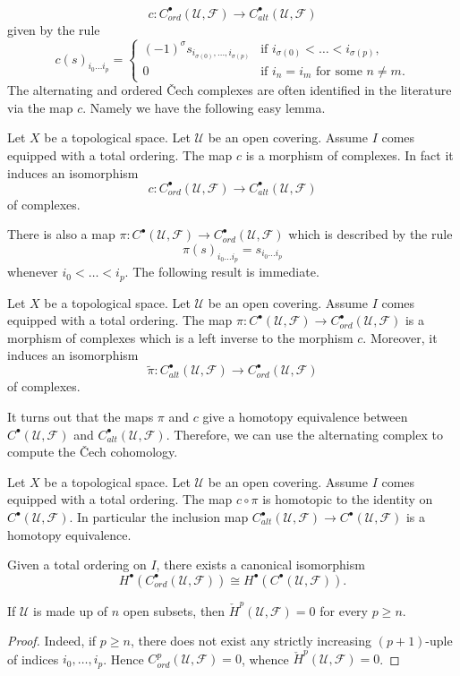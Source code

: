 \[c:C^\bullet_{ord}(\mathcal{U},\mathscr{F})\to C^\bullet_{alt}(\mathcal{U},\mathscr{F})\]
given by the rule
\[c(s)_{i_0\dots i_p}=\begin{cases}
(-1)^\sigma s_{i_{\sigma(0)},\dots,i_{\sigma(p)}}&\text{if } i_{\sigma(0)}<\dots<i_{\sigma(p)},\\
0&\text{if $i_n=i_m$ for some $n\neq m$}.
\end{cases}\]
The alternating and ordered \v{C}ech complexes are often identified in the literature via the map $c$. Namely we have the following easy lemma.
\begin{lemma}
Let $X$ be a topological space. Let $\mathcal{U}$ be an open covering. Assume $I$ comes equipped with a total ordering. The map $c$ is a morphism of complexes. In fact it induces an isomorphism
\[c:C^\bullet_{ord}(\mathcal{U},\mathscr{F})\to C^\bullet_{alt}(\mathcal{U},\mathscr{F})\]
of complexes.
\end{lemma}
There is also a map $\pi:C^\bullet(\mathcal{U},\mathscr{F})\to C^\bullet_{ord}(\mathcal{U},\mathscr{F})$ which is described by the rule
\[\pi(s)_{i_0\dots i_p}=s_{i_0\dots i_p}\]
whenever $i_0<\dots<i_p$. The following result is immediate.
\begin{lemma}
Let $X$ be a topological space. Let $\mathcal{U}$ be an open covering. Assume $I$ comes equipped with a total ordering. The map 
$\pi:C^\bullet(\mathcal{U},\mathscr{F})\to C^\bullet_{ord}(\mathcal{U},\mathscr{F})$ is a morphism of complexes which is a left inverse to the morphism $c$. Moreover, 
it induces an isomorphism
\[\tilde{\pi}:C^\bullet_{alt}(\mathcal{U},\mathscr{F})\to C^\bullet_{ord}(\mathcal{U},\mathscr{F})\]
of complexes.
\end{lemma}
It turns out that the maps $\pi$ and $c$ give a homotopy equivalence between $C^\bullet(\mathcal{U},\mathscr{F})$ and $C^\bullet_{alt}(\mathcal{U},\mathscr{F})$. Therefore, we can 
use the alternating complex to compute the \v{C}ech cohomology.
\begin{theorem}
Let $X$ be a topological space. Let $\mathcal{U}$ be an open covering. Assume $I$ comes equipped with a total ordering. The map $c\circ\pi$ is homotopic to the identity on $C^\bullet(\mathcal{U},\mathscr{F})$. In particular the inclusion map $C^\bullet_{alt}(\mathcal{U},\mathscr{F})\to C^\bullet(\mathcal{U},\mathscr{F})$ is a homotopy equivalence.
\end{theorem}
\begin{corollary}
Given a total ordering on $I$, there exists a canonical isomorphism \[H^\bullet(C_{ord}^\bullet(\mathcal{U},\mathscr{F}))\cong H^\bullet(C^\bullet(\mathcal{U},\mathscr{F})).\]
\end{corollary}
\begin{corollary}
If $\mathcal{U}$ is made up of $n$ open subsets, then $\check{H}^p(\mathcal{U},\mathscr{F})=0$ for every $p\geq n$.
\end{corollary}
\begin{proof}
Indeed, if $p\geq n$, there does not exist any strictly increasing $(p+1)$-uple of indices $i_0,\dots,i_p$. Hence $C_{ord}^p(\mathcal{U},\mathscr{F})=0$, whence $\check{H}^p(\mathcal{U},\mathscr{F})=0$.
\end{proof}
